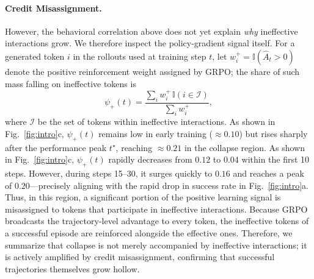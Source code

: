 \documentclass[letterpaper]{article} %
\begin{document}
\paragraph{Credit Misassignment.} 
However, the behavioral correlation above does not yet explain \emph{why} ineffective interactions grow. 
We therefore inspect the policy-gradient signal itself.
For a generated token $i$ in the rollouts used at training step $t$, 
let $w_i^+ = \mathbb{I}(\hat A_t>0)$ denote the positive reinforcement weight assigned by GRPO; 
the share of such mass falling on ineffective tokens is
\begin{equation}
\label{eq:psi_plus}
    \psi_+(t)
    =
    \frac{\sum_{i} w_i^+\,\mathbb{I}(i\in\mathcal{I})}
         {\sum_{i} w_i^+},
\end{equation}
where $\mathcal{I}$ be the set of tokens within ineffective interactions.
As shown in Fig.~\ref{fig:intro}c, $\psi_+(t)$ remains low in early training ($\approx\!0.10$) but rises sharply after the performance peak $t^\star$, reaching $\approx\!0.21$ in the collapse region.
As shown in Fig.~\ref{fig:intro}c, $\psi_+(t)$ rapidly decreases from $0.12$ to $0.04$ within the first 10 steps. However, during steps 15--30, it surges quickly to $0.16$ and reaches a peak of $0.20$---precisely aligning with the rapid drop in success rate in Fig.~\ref{fig:intro}a.
Thus, in this region, a significant portion of the positive learning signal is misassigned to tokens that participate in ineffective interactions.
Because GRPO broadcasts the trajectory-level advantage to every token, the ineffective tokens of a successful episode are reinforced alongside the effective ones.
Therefore, we summarize that collapse is not merely accompanied by ineffective interactions; it is actively amplified by credit misassignment, confirming that successful trajectories themselves grow hollow.
\end{document}
